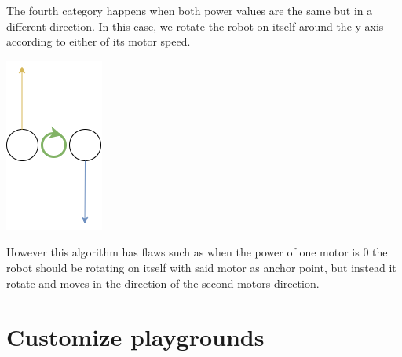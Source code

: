 \documentclass{scrbook}
\begin{document}
The fourth category happens when both power values are the same but in a different direction. In this case, we rotate the robot on itself around the y-axis according to either of its motor speed.
\begin{center}
  \includegraphics[scale=1]{./move_spdd}
\end{center}

However this algorithm has flaws such as when the power of one motor is 0 the robot should be rotating on itself with said motor as anchor point, but instead it rotate and moves in the direction of the second motors direction.


\section{Customize playgrounds}
\end{document}
